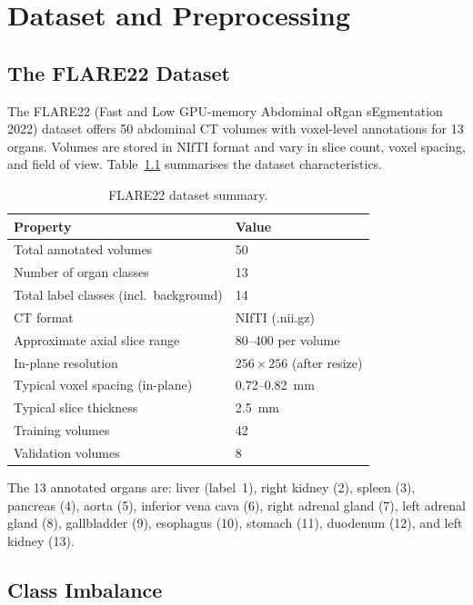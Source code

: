 \chapter{Dataset and Preprocessing}
\label{chap:data}

\section{The FLARE22 Dataset}

The FLARE22 (Fast and Low GPU-memory Abdominal oRgan sEgmentation 2022) dataset offers 50 abdominal CT volumes with voxel-level annotations for 13 organs. Volumes are stored in NIfTI format and vary in slice count, voxel spacing, and field of view. Table~\ref{tab:dataset} summarises the dataset characteristics.

\begin{table}[h!]
\centering
\caption{FLARE22 dataset summary.}
\label{tab:dataset}
\begin{tabular}{ll}
\toprule
\textbf{Property} & \textbf{Value} \\
\midrule
Total annotated volumes          & 50 \\
Number of organ classes          & 13 \\
Total label classes (incl.\ background) & 14 \\
CT format                        & NIfTI (.nii.gz) \\
Approximate axial slice range    & 80--400 per volume \\
In-plane resolution              & $256 \times 256$ (after resize) \\
Typical voxel spacing (in-plane) & 0.72--0.82~mm \\
Typical slice thickness          & 2.5~mm \\
Training volumes                 & 42 \\
Validation volumes               & 8 \\
\bottomrule
\end{tabular}
\end{table}

\noindent
The 13 annotated organs are: liver (label~1), right kidney (2), spleen (3), pancreas (4), aorta (5), inferior vena cava (6), right adrenal gland (7), left adrenal gland (8), gallbladder (9), esophagus (10), stomach (11), duodenum (12), and left kidney (13).

\section{Class Imbalance}

